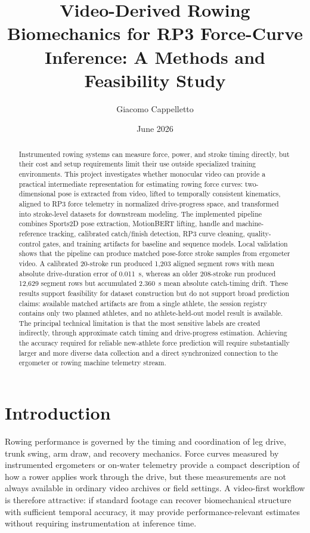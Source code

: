 \documentclass[11pt]{article}
\title{\textbf{Video-Derived Rowing Biomechanics for RP3 Force-Curve Inference: A Methods and Feasibility Study}}
\author{Giacomo Cappelletto}
\date{June 2026}
\begin{document}
\maketitle

\begin{abstract}
Instrumented rowing systems can measure force, power, and stroke timing directly, but their cost and setup requirements limit their use outside specialized training environments. This project investigates whether monocular video can provide a practical intermediate representation for estimating rowing force curves: two-dimensional pose is extracted from video, lifted to temporally consistent kinematics, aligned to RP3 force telemetry in normalized drive-progress space, and transformed into stroke-level datasets for downstream modeling. The implemented pipeline combines Sports2D pose extraction, MotionBERT lifting, handle and machine-reference tracking, calibrated catch/finish detection, RP3 curve cleaning, quality-control gates, and training artifacts for baseline and sequence models. Local validation shows that the pipeline can produce matched pose-force stroke samples from ergometer video. A calibrated 20-stroke run produced 1,203 aligned segment rows with mean absolute drive-duration error of \SI{0.011}{s}, whereas an older 208-stroke run produced 12,629 segment rows but accumulated \SI{2.360}{s} mean absolute catch-timing drift. These results support feasibility for dataset construction but do not support broad prediction claims: available matched artifacts are from a single athlete, the session registry contains only two planned athletes, and no athlete-held-out model result is available. The principal technical limitation is that the most sensitive labels are created indirectly, through approximate catch timing and drive-progress estimation. Achieving the accuracy required for reliable new-athlete force prediction will require substantially larger and more diverse data collection and a direct synchronized connection to the ergometer or rowing machine telemetry stream.
\end{abstract}

\section{Introduction}
Rowing performance is governed by the timing and coordination of leg drive, trunk swing, arm draw, and recovery mechanics. Force curves measured by instrumented ergometers or on-water telemetry provide a compact description of how a rower applies work through the drive, but these measurements are not always available in ordinary video archives or field settings. A video-first workflow is therefore attractive: if standard footage can recover biomechanical structure with sufficient temporal accuracy, it may provide performance-relevant estimates without requiring instrumentation at inference time.
\end{document}
